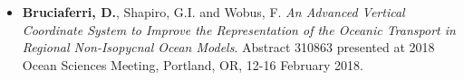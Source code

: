 \documentclass[a4paper, oneside, final]{scrartcl}
\begin{document}
\begin{itemize}
\item \textbf{Bruciaferri, D.}, Shapiro, G.I. and Wobus, F. \textit{An Advanced Vertical Coordinate System to Improve the Representation of the Oceanic Transport in Regional Non-Isopycnal Ocean Models}. Abstract 310863 presented at 2018 Ocean Sciences Meeting, Portland, OR, 12-16 February 2018.
\end{itemize}
\end{document}
